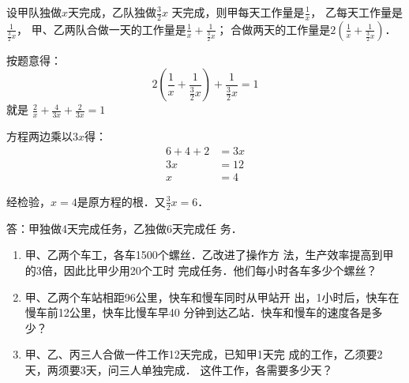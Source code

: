 \begin{solution}
    设甲队独做$x$天完成，乙队独做$\frac{3}{2}x$
天完成，则甲每天工作量是$\frac{1}{x}$，
乙每天工作量是$\frac{1}{\tfrac{3}{2}x}$，
甲、乙两队合做一天的工作量是$\frac{1}{x}+\frac{1}{\tfrac{3}{2}x}$；
合做两天的工作量是$2\left(\frac{1}{x}+\frac{1}{\tfrac{3}{2}x}\right)$．

按题意得：
\[2\left(\frac{1}{x}+\frac{1}{\tfrac{3}{2}x}\right)+\frac{1}{\tfrac{3}{2}x}=1\]
就是 $\frac{2}{x}+\frac{4}{3x}+\frac{2}{3x}=1$

方程两边乘以$3x$得：
\[\begin{split}
   6+4+2&=3x\\
3x&=12\\
x&=4 
\end{split}\]

经检验，$x=4$是原方程的根．又$\frac{3}{2}x=6$．

答：甲独做4天完成任务，乙独做6天完成任
务．
\end{solution}

\begin{ex}
\begin{enumerate}
    \item 甲、乙两个车工，各车1500个螺丝．乙改进了操作方
    法，生产效率提高到甲的3倍，因此比甲少用20个工时
    完成任务．他们每小时各车多少个螺丝？
    \item 甲、乙两个车站相距96公里，快车和慢车同时从甲站开
    出，1小时后，快车在慢车前12公里，快车比慢车早40
    分钟到达乙站．快车和慢车的速度各是多少？
    \item 甲、乙、丙三人合做一件工作12天完成，已知甲1天完
    成的工作，乙须要2天，两须要3天，问三人单独完成．
    这件工作，各需要多少天？
\end{enumerate}    
\end{ex}

